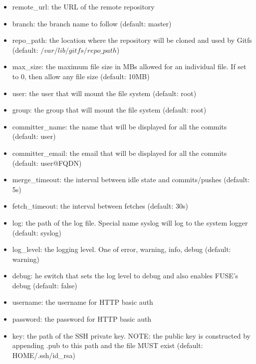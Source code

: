 \begin{itemize}
    \item remote\_url: the URL of the remote repository
    \item branch: the branch name to follow (default: master)
    \item repo\_path: the location where the repository will be cloned and used by Gitfs
    (default: $/var/lib/gitfs/repo\_path$)
    \item max\_size: the maximum file size in MBs allowed for an individual file. If set to 0, then allow any file size (default: 10MB)
    \item user: the user that will mount the file system (default: root)
    \item group: the group that will mount the file system (default: root)
    \item committer\_name: the name that will be displayed for all the commits (default: user)
    \item committer\_email: the email that will be displayed for all the commits (default: user@FQDN)
    \item merge\_timeout: the interval between idle state and commits/pushes (default: 5s)
    \item fetch\_timeout: the interval between fetches (default: 30s)
    \item log: the path of the log file. Special name syslog will log to the system logger (default: syslog)
    \item log\_level: the logging level. One of error, warning, info, debug (default: warning)
    \item debug: he switch that sets the log level to debug and also enables FUSE’s debug (default: false)
    \item username: the username for HTTP basic auth 
    \item password: the password for HTTP basic auth
    \item key: the path of the SSH private key. NOTE: the public key is constructed by appending .pub to this path and the file MUST exist (default: \textdollar HOME/.ssh/id\_rsa)
\end{itemize}